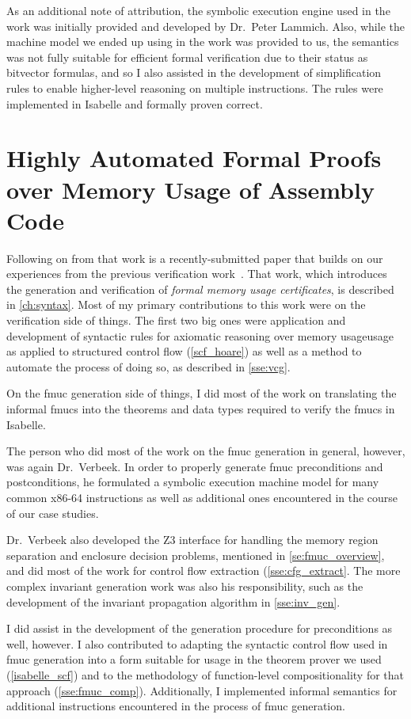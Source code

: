 As an additional note of attribution, the symbolic execution engine
used in the work was initially provided and developed by Dr.~Peter Lammich.
Also, while the machine model we ended up using in the work was provided to us,
the semantics was not fully suitable for efficient formal verification
due to their status as bitvector formulas,
and so I also assisted in the development of simplification rules
to enable higher-level reasoning on multiple instructions.
The rules were implemented in Isabelle and formally proven correct.

\section*{Highly Automated Formal Proofs
  over Memory Usage of Assembly Code}\label{attribute2}
Following on from that work is a recently-submitted paper
that builds on our experiences from the previous verification
work~\citep{popl2019underreview}. That work,
which introduces the generation and verification of
\emph{formal memory usage certificates}, is described in \cref{ch:syntax}.
Most of my primary contributions to this work were on the verification side of things.
The first two big ones were application and development of syntactic rules
for axiomatic reasoning over memory usageusage
as applied to structured control flow (\cref{scf_hoare})
as well as a method to automate the process of doing so, 
as described in \cref{sse:vcg}.

On the \ac{fmuc} generation side of things,
I did most of the work on translating the informal \acp{fmuc}
into the theorems and data types required to verify the \acp{fmuc} in Isabelle.

The person who did most of the work on the \ac{fmuc} generation in general,
however, was again Dr.~Verbeek.
In order to properly generate \ac{fmuc} preconditions and postconditions,
he formulated a symbolic execution machine model for many common x86-64 instructions
as well as additional ones encountered in the course of our case studies.

Dr.~Verbeek also developed the Z3 interface
for handling the memory region separation and enclosure decision problems,
mentioned in \cref{se:fmuc_overview},
and did most of the work for control flow extraction (\cref{sse:cfg_extract}.
The more complex invariant generation work was also his responsibility,
such as the development of the invariant propagation algorithm in \cref{sse:inv_gen}.

I did assist in the development of the generation procedure for preconditions as well,
however.
I also contributed to adapting the syntactic control flow used in \ac{fmuc} generation
into a form suitable for usage in the theorem prover we used (\cref{isabelle_scf})
and to the methodology of function-level compositionality for that approach
(\cref{sse:fmuc_comp}).
Additionally, I implemented informal semantics for additional instructions encountered
in the process of \ac{fmuc} generation.
